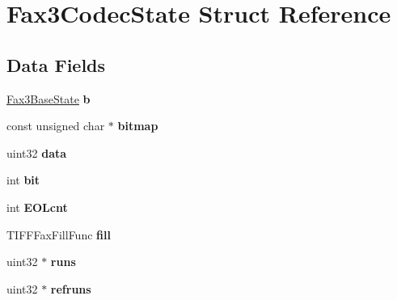\hypertarget{struct_fax3_codec_state}{}\section{Fax3\+Codec\+State Struct Reference}
\label{struct_fax3_codec_state}
\subsection*{Data Fields}
\begin{DoxyCompactItemize}
\item 
\hypertarget{struct_fax3_codec_state_a363506b01518e87b670c5c3d1c4bd4da}{}\hyperlink{struct_fax3_base_state}{Fax3\+Base\+State} {\bfseries b}\label{struct_fax3_codec_state_a363506b01518e87b670c5c3d1c4bd4da}

\item 
\hypertarget{struct_fax3_codec_state_acc98095623e60ea6d8bb7ab5e2ba239b}{}const unsigned char $\ast$ {\bfseries bitmap}\label{struct_fax3_codec_state_acc98095623e60ea6d8bb7ab5e2ba239b}

\item 
\hypertarget{struct_fax3_codec_state_a0be738b5bfc7096ec6dba081a978b471}{}uint32 {\bfseries data}\label{struct_fax3_codec_state_a0be738b5bfc7096ec6dba081a978b471}

\item 
\hypertarget{struct_fax3_codec_state_a276ec4ea44aa77416c732159c90a37b9}{}int {\bfseries bit}\label{struct_fax3_codec_state_a276ec4ea44aa77416c732159c90a37b9}

\item 
\hypertarget{struct_fax3_codec_state_aa96c4f06a9feed03e8c2e4c044b1ec03}{}int {\bfseries E\+O\+Lcnt}\label{struct_fax3_codec_state_aa96c4f06a9feed03e8c2e4c044b1ec03}

\item 
\hypertarget{struct_fax3_codec_state_ad21bbface8c2fc45c53bba120c5d15c3}{}T\+I\+F\+F\+Fax\+Fill\+Func {\bfseries fill}\label{struct_fax3_codec_state_ad21bbface8c2fc45c53bba120c5d15c3}

\item 
\hypertarget{struct_fax3_codec_state_a06c0c599f77cbe1d2d7b7aaec6537396}{}uint32 $\ast$ {\bfseries runs}\label{struct_fax3_codec_state_a06c0c599f77cbe1d2d7b7aaec6537396}

\item 
\hypertarget{struct_fax3_codec_state_a79876672e54900a16244e525eff84373}{}uint32 $\ast$ {\bfseries refruns}\label{struct_fax3_codec_state_a79876672e54900a16244e525eff84373}


\end{DoxyCompactItemize}
